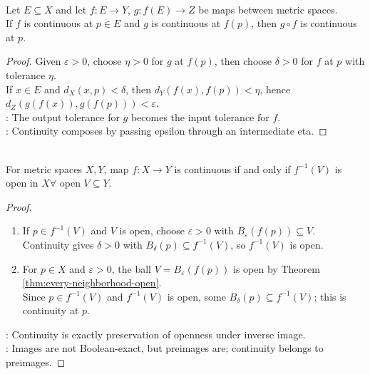 \begin{theorem} \label{thm:continuous-composition} \\
Let $E\subseteq X$ and let $f:E\to Y$, $g:f(E)\to Z$ be maps between metric spaces.\\
If $f$ is continuous at $p\in E$ and $g$ is continuous at $f(p)$, then $g\circ f$ is continuous at $p$.
\begin{proof}
Given $\varepsilon>0$, choose $\eta>0$ for $g$ at $f(p)$, then choose $\delta>0$ for $f$ at $p$ with tolerance $\eta$.\\
If $x\in E$ and $d_X(x,p)<\delta$, then $d_Y(f(x),f(p))<\eta$, hence $d_Z(g(f(x)),g(f(p)))<\varepsilon$.\\
: The output tolerance for $g$ becomes the input tolerance for $f$.\\
: Continuity composes by passing epsilon through an intermediate eta.
\end{proof}
\end{theorem}

\begin{theorem} \label{thm:continuity-open-preimages}\label{thm:continuity-structure-results-source-todo} \\
For metric spaces $X,Y$, map $f:X\to Y$ is continuous if and only if $f^{-1}(V)$ is open in $X \forall$ open $V\subseteq Y$.
\begin{proof}
\begin{enumerate}[label=\roman*.]
\setlength{\itemsep}{0pt}
\item[$(\Rightarrow)$] If $p\in f^{-1}(V)$ and $V$ is open, choose $\varepsilon>0$ with $B_\varepsilon(f(p))\subseteq V$.\\
Continuity gives $\delta>0$ with $B_\delta(p)\subseteq f^{-1}(V)$, so $f^{-1}(V)$ is open.
\item[$(\Leftarrow)$] For $p\in X$ and $\varepsilon>0$, the ball $V=B_\varepsilon(f(p))$ is open by Theorem \ref{thm:every-neighborhood-open}.\\
Since $p\in f^{-1}(V)$ and $f^{-1}(V)$ is open, some $B_\delta(p)\subseteq f^{-1}(V)$; this is continuity at $p$.
\end{enumerate}
: Continuity is exactly preservation of openness under inverse image.\\
: Images are not Boolean-exact, but preimages are; continuity belongs to preimages.
\end{proof}
\end{theorem}

